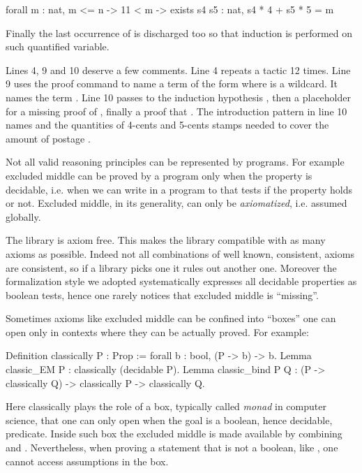 \begin{coq}{}{}
forall m : nat,
  m <= n -> 11 < m -> exists s4 s5 : nat, s4 * 4 + s5 * 5 = m
\end{coq}
Finally the last occurrence of  is discharged too so that induction is performed
on such quantified variable.

Lines 4, 9 and 10 deserve a few comments.  Line 4 repeats a tactic
12 times.  Line 9 uses the  proof command to name  a
term of the form  where \C{_} is a wildcard. It names
 the term .  Line 10 passes to the induction
hypothesis , then a placeholder for a missing proof
of , finally a proof that .  The introduction
pattern in line 10 names  and  the quantities of
4-cents and 5-cents stamps needed to cover the amount of postage .



Not all valid reasoning principles can be represented by programs.
For example excluded middle can be proved by a program only when
the property is decidable, i.e. when we can write in \Coq{} a program
to  that tests if the property holds or not.
Excluded middle, in its generality, can only be \emph{axiomatized},
i.e. assumed globally.

The \mcbMC{} library is axiom free.  This makes the library compatible
with as many axioms as possible.  Indeed not all combinations of well
known, consistent, axioms are consistent, so if a library picks
one it rules out another one.  Moreover the formalization style
we adopted systematically expresses all decidable properties
as boolean tests, hence one rarely notices that excluded middle
is ``missing''.

Sometimes axioms like excluded middle can be confined into ``boxes''
one can open only in contexts where they can be actually proved.
For example:

\begin{coq}{}{}
Definition classically P : Prop := forall b : bool, (P -> b) -> b.
Lemma classic_EM P : classically (decidable P).
Lemma classic_bind P Q :
  (P -> classically Q) -> classically P -> classically Q.
\end{coq}
Here classically plays the role of a box, typically called \emph{monad}
in computer science, that one can only open when the goal is a boolean,
hence decidable, predicate.  Inside such box the excluded middle is
made available by combining  and .
Nevertheless, when proving a statement that is not a boolean, like
, one cannot access assumptions in the  box.


